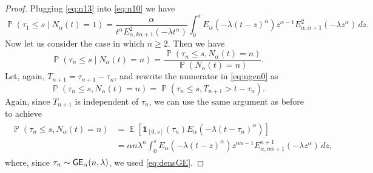 \documentclass[]{amsart}
\numberwithin{equation}{section}
\theoremstyle{remark}
\theoremstyle{definition}
\DeclareMathOperator{\E}{\mathbb{E}}
\DeclareMathOperator{\bP}{\mathbb{P}}
\newcommand{\der}[2]{\frac{d #1}{d #2}}
\begin{document}
\begin{proof}
	Plugging \eqref{eq:n13} into \eqref{eq:n10} we have
	\begin{equation}\label{eq:n10fin}
		\bP(\tau_1 \le s \mid N_\alpha(t)=1)=\frac{\alpha}{t^\alpha E^{2}_{\alpha,k\alpha+1}(-\lambda t^\alpha)} \int_{0}^{s}E_\alpha(-\lambda(t-z)^\alpha)z^{\alpha-1}E^2_{\alpha,\alpha+1}(-\lambda z^\alpha)\, dz.
	\end{equation}
	Now let us consider the case in which $n \ge 2$. Then we have
	\begin{equation}\label{eq:ngen0}
		\bP(\tau_n \le s \mid N_\alpha(t)=n)=\frac{\bP(\tau_n \le s, N_\alpha(t)=n)}{\bP(N_\alpha(t)=n)}.
	\end{equation}
	Let, again, $T_{n+1}=\tau_{n+1}-\tau_n$, and rewrite the numerator in \eqref{eq:ngen0} as
	\begin{equation*}
		\bP(\tau_n \le s, N_\alpha(t)=n)=\bP(\tau_n \le s, T_{n+1}>t-\tau_n).
	\end{equation*}
	Again, since $T_{n+1}$ is independent of $\tau_n$, we can use the same argument as before to achieve
	\begin{align}\label{eq:ngen2}
		\begin{split}
			\bP(\tau_n \le s, N_\alpha(t)=n)&=\E\left[\mathbf{1}_{[0,s]}(\tau_n)E_\alpha(-\lambda(t-\tau_n)^{\alpha})\right]\\
			&=\alpha n \lambda^n \int_0^s E_\alpha(-\lambda (t-z)^\alpha)z^{n\alpha-1}E_{\alpha,n\alpha+1}^{n+1}(-\lambda z^\alpha)\, dz,	
		\end{split}
	\end{align}
	where, since $\tau_n \sim {\sf GE}_\alpha(n,\lambda)$, we used \eqref{eq:densGE}.

\end{proof}
\end{document}
